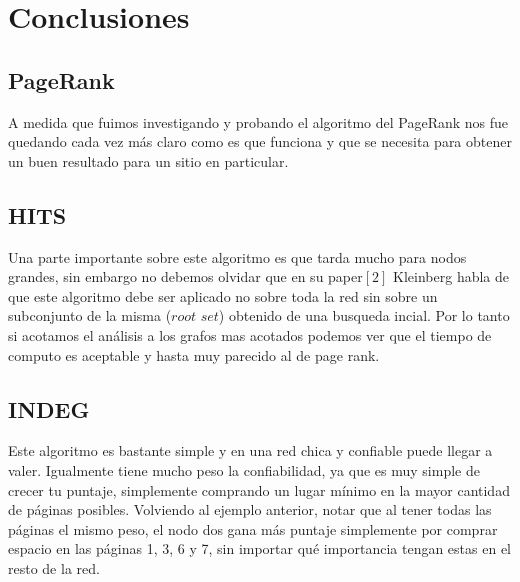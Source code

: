 
\section{Conclusiones}

\subsection{PageRank}

A medida que fuimos investigando y probando el algoritmo del PageRank nos fue quedando cada vez más claro como es que funciona y que se necesita para obtener un buen resultado para un sitio en particular.
\newpage


\subsection{HITS}

Una parte importante sobre este algoritmo es que tarda mucho para nodos grandes, sin embargo no debemos olvidar que en su paper$[2]$ Kleinberg habla de que este algoritmo debe ser aplicado no sobre toda la red sin sobre un subconjunto de la misma ($\textit{root set}$) obtenido de una busqueda incial. Por lo tanto si acotamos el análisis a los grafos mas acotados podemos ver que el tiempo de computo es aceptable y hasta muy parecido al de page rank. 

\subsection{INDEG}

Este algoritmo es bastante simple y en una red chica y confiable puede llegar a valer. Igualmente tiene mucho peso la confiabilidad, ya que es muy simple de crecer tu puntaje, simplemente comprando un lugar mínimo en la mayor cantidad de páginas posibles. Volviendo al ejemplo anterior, notar que al tener todas las páginas el mismo peso, el nodo dos gana más puntaje simplemente por comprar espacio en las páginas 1, 3, 6 y 7, sin importar qué importancia tengan estas en el resto de la red.

